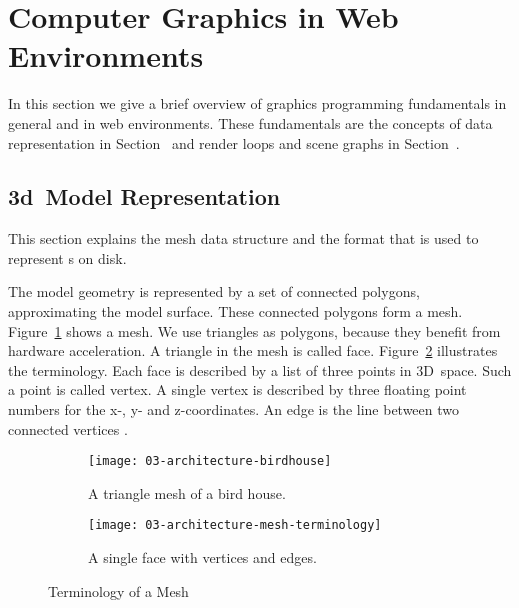 \documentclass[../../ClassicThesis.tex]{subfiles}
\begin{document}
\section{Computer Graphics in Web Environments}
\label{sec:cg-web}

In this section we give a brief overview of graphics programming
fundamentals in general and in web environments. These fundamentals
are the concepts of {\threedmodel} data representation in
Section~ and render loops and scene
graphs in Section~.

\subsection{3d~Model Representation}
\label{sub:model-representation}

This section explains the mesh data structure and the {\stlfile}
format that is used to represent {\threedmodel}s on disk.

The model geometry is represented by a set of connected
polygons, approximating the model surface. These connected
polygons form a mesh. Figure~\ref{fig:term-mesh:mesh} shows
a mesh. We use triangles as polygons, because they
benefit from hardware acceleration. A triangle in the mesh
is called face. Figure~\ref{fig:term-mesh:face} illustrates
the terminology. Each face is described by a list of three
points in 3D~space. Such a point is called vertex. A single
vertex is described by three floating point numbers for the
x-, y- and z-coordinates. An edge is the line between two
connected vertices \cite[p.~3]{intro-cg}.

\begin{figure}[h]
  \centering
  \begin{subfigure}[b]{0.49\textwidth}
    \centering
    \texttt{[image: 03-architecture-birdhouse]}
    \caption{A triangle mesh of a bird house.}
    \label{fig:term-mesh:mesh}
  \end{subfigure}
  \begin{subfigure}[b]{0.49\textwidth}
    \centering
    \texttt{[image: 03-architecture-mesh-terminology]}
    \caption{A single face with vertices and edges.}
    \label{fig:term-mesh:face}
  \end{subfigure}
  \caption{Terminology of a Mesh}
  \label{fig:term-mesh}
\end{figure}
\end{document}
